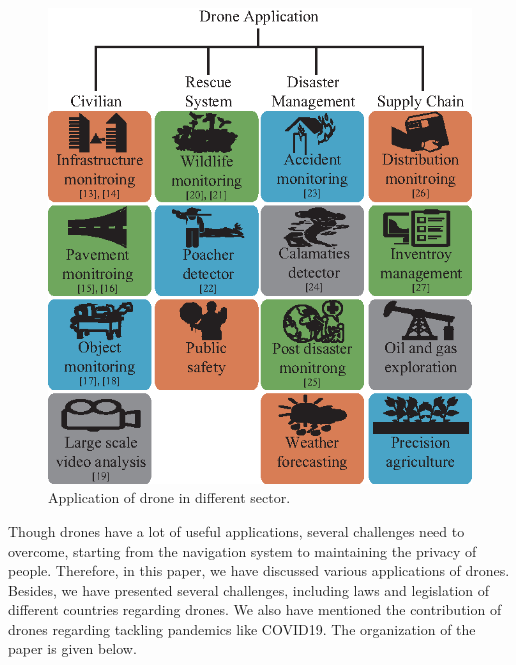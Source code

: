 \begin{figure}[h!]
\centering
\includegraphics[width=\linewidth]{figure/applicaitonfig.eps}
\caption{Application of drone in different sector.}
\label{applicaitonfig}
\end{figure}
%

Though drones have a lot of useful applications, several challenges need to overcome, starting from the navigation system to maintaining the privacy of people. Therefore, in this paper, we have discussed various applications of drones. Besides, we have presented several challenges, including laws and legislation of different countries regarding drones. We also have mentioned the contribution of drones regarding tackling pandemics like COVID19. The organization of the paper is given below.

